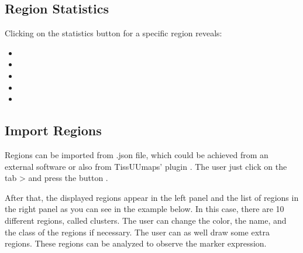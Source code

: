 \documentclass[letterpaper,10pt,english,openany,oneside]{sphinxmanual}
\begin{document}
\subsection{Region Statistics}
\label{\detokenize{docs/starting/regions:region-statistics}}
\sphinxAtStartPar
Clicking on the statistics button for a specific region reveals:
\begin{itemize}
\item {} 
\sphinxAtStartPar
{}

\item {} 
\sphinxAtStartPar
{}

\item {} 
\sphinxAtStartPar
{}

\item {} 
\sphinxAtStartPar
{}

\item {} 
\sphinxAtStartPar
{}

\end{itemize}

\sphinxAtStartPar
{}


\subsection{Import Regions}
\label{\detokenize{docs/starting/regions:import-regions}}
\sphinxAtStartPar
Regions can be imported from .json file, which could be achieved from an external software or also from TissUUmaps’ plugin . The user just click on the tab  \sphinxhyphen{}\textgreater{}  and press the button .

\sphinxAtStartPar
{}

\sphinxAtStartPar
After that, the displayed regions appear in the left panel and the list of regions in the right panel as you can see in the example below. In this case, there are 10 different regions, called clusters. The user can change the color, the name, and the class of the regions if necessary. The user can as well draw some extra regions. These regions can be analyzed to observe the marker expression.

\sphinxAtStartPar
{}
\end{document}
